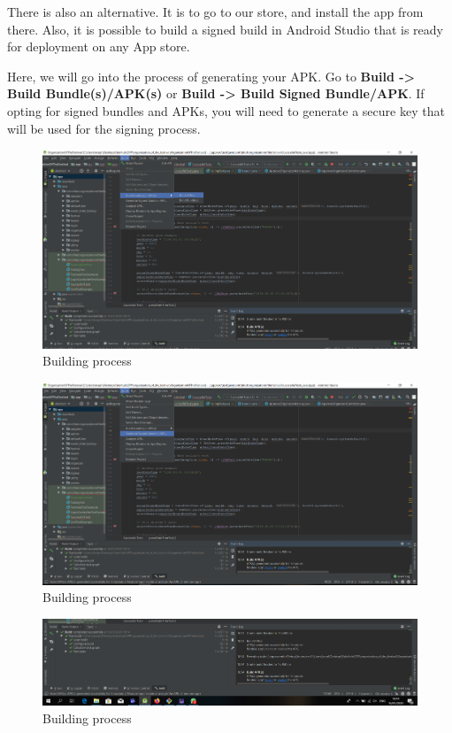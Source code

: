 			There is also an alternative. It is to go to our store, and install the app from there. Also, it is possible to build a signed build in Android Studio that is ready for deployment on any App store.
			
			Here, we will go into the process of generating your APK. Go to \textbf{Build -> Build Bundle(s)/APK(s)} or \textbf{Build -> Build Signed Bundle/APK}. If opting for signed bundles and APKs, you will need to generate a secure key that will be used for the signing process.
			
			\begin{figure}[H]
				\includegraphics[width=\linewidth]{images/Deploy_M_3.png}
				\caption{Building process}
				\label{fig:install_3}
			\end{figure}
			
			\begin{figure}[H]
				\includegraphics[width=\linewidth]{images/Deploy_M_4.png}
				\caption{Building process}
				\label{fig:install_4}
			\end{figure}
			
			\begin{figure}[H]
				\includegraphics[width=\linewidth]{images/Deploy_M_5.png}
				\caption{Building process}
				\label{fig:install_5}
			\end{figure}
			
